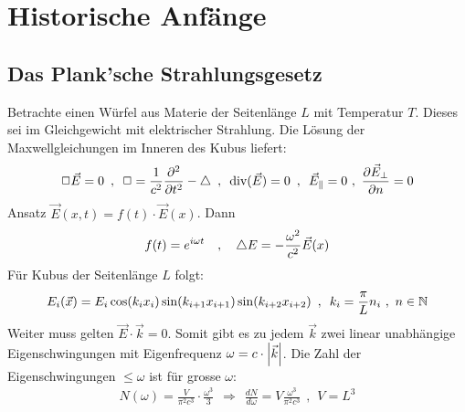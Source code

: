 \section{Historische Anfänge}

\subsection{Das Plank'sche Strahlungsgesetz}

Betrachte einen Würfel aus Materie der Seitenlänge $L$ mit Temperatur $T$.
Dieses sei im Gleichgewicht mit elektrischer Strahlung. Die Lösung der
Maxwellgleichungen im Inneren des Kubus liefert:
\begin{align*}
    \Box \vec{E} = 0
    \hspace{5pt} , \hspace{5pt}
    \Box = \frac{1}{c^2} \frac{\partial^2}{\partial t^2} - \bigtriangleup
    \hspace{5pt} , \hspace{5pt}
    \text{div}(\vec{E}) = 0
    \hspace{5pt} , \hspace{5pt}
    \vec{E}_{\parallel} = 0 \ , \ \frac{\partial \vec{E}_{\perp}}{\partial n} = 0
\end{align*}
Ansatz $\vec{E}(x,t) = f(t) \cdot \vec{E}(x)$. Dann
\begin{align*}
    f(t) = e^{i \omega t}
    \hspace{10pt} , \hspace{10pt}
    \bigtriangleup E = - \frac{\omega^2}{c^2} \vec{E}(x)
\end{align*}
Für Kubus der Seitenlänge $L$ folgt:
\begin{align*}
    E_i (\vec{x}) = E_i \cos(k_i x_i) \sin(k_{i+1} x_{i+1}) \sin(k_{i+2} x_{i+2})
    \hspace{5pt} , \hspace{5pt}
    k_i = \frac{\pi}{L} n_i \ , \ n \in \mathbb{N}
\end{align*}
Weiter muss gelten $\vec{E} \cdot \vec{k} = 0$. Somit gibt es zu jedem $\vec{k}$
zwei linear unabhängige Eigenschwingungen mit Eigenfrequenz $\omega = c \cdot
\left\vert \vec{k} \right\vert$. Die Zahl der Eigenschwingungen $\leq \omega$ ist für grosse
$\omega$:
\begin{align*}
    N(\omega) = \frac{V}{\pi^2 c^3} \cdot \frac{\omega^3}{3}
    \hspace{5pt} \Rightarrow \hspace{5pt}
    \frac{d N}{d \omega} = V \frac{\omega^3}{\pi^2 c^3}
    \hspace{5pt} , \hspace{5pt}
    V = L^3
\end{align*}
